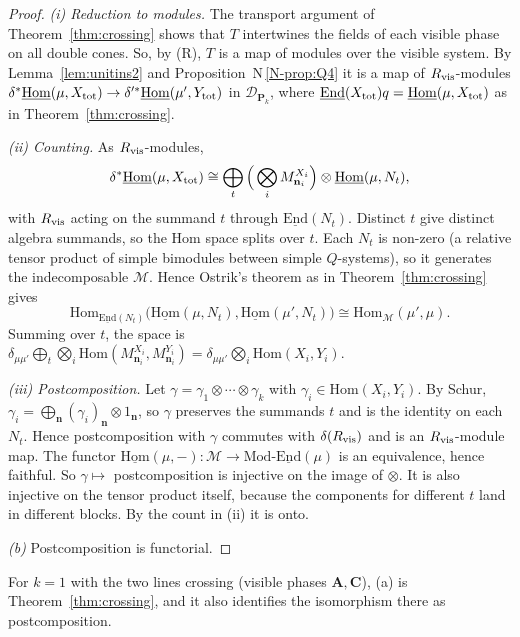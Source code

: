 \documentclass[11pt]{article}
\theoremstyle{definition}
\theoremstyle{remark}
\newcommand{\bfA}{\mathbf A}
\newcommand{\bfC}{\mathbf C}
\newcommand{\nref}[1]{N\,\ref{N-#1}}
\begin{document}
\begin{proof}
\emph{(i) Reduction to modules.} The transport argument of Theorem~\ref{thm:crossing} shows that $T$ intertwines the fields of each visible phase on all double cones. So, by (R), $T$ is a map of modules over the visible system. By Lemma~\ref{lem:unitins2} and Proposition~\nref{prop:Q4} it is a map of $R_{\rm vis}$-modules $\delta^*\underline{\mathrm{Hom}}(\mu,X_{\rm tot})\to\delta'^*\underline{\mathrm{Hom}}(\mu',Y_{\rm tot})$ in $\mathcal D_{\mathbf P_k}$, where $\underline{\mathrm{End}}(X_{\rm tot})q=\underline{\mathrm{Hom}}(\mu,X_{\rm tot})$ as in Theorem~\ref{thm:crossing}.

\emph{(ii) Counting.} As $R_{\rm vis}$-modules,
\[
\delta^*\underline{\mathrm{Hom}}(\mu,X_{\rm tot})\cong\bigoplus_t\Big(\bigotimes_iM^{X_i}_{\mathbf n_i}\Big)\otimes\underline{\mathrm{Hom}}(\mu,N_t),
\]
with $R_{\rm vis}$ acting on the summand $t$ through $\underline{\mathrm{End}}(N_t)$. Distinct $t$ give distinct algebra summands, so the Hom space splits over $t$. Each $N_t$ is non-zero (a relative tensor product of simple bimodules between simple $Q$-systems), so it generates the indecomposable $\mathcal M$. Hence Ostrik's theorem as in Theorem~\ref{thm:crossing} gives
\[
\mathrm{Hom}_{\underline{\mathrm{End}}(N_t)}\big(\underline{\mathrm{Hom}}(\mu,N_t),\underline{\mathrm{Hom}}(\mu',N_t)\big)\cong\mathrm{Hom}_{\mathcal M}(\mu',\mu).
\]
Summing over $t$, the space is $\delta_{\mu\mu'}\bigoplus_t\bigotimes_i\mathrm{Hom}(M^{X_i}_{\mathbf n_i},M^{Y_i}_{\mathbf n_i})=\delta_{\mu\mu'}\bigotimes_i\mathrm{Hom}(X_i,Y_i)$.

\emph{(iii) Postcomposition.} Let $\gamma=\gamma_1\otimes\cdots\otimes\gamma_k$ with $\gamma_i\in\mathrm{Hom}(X_i,Y_i)$. By Schur, $\gamma_i=\bigoplus_{\mathbf n}(\gamma_i)_{\mathbf n}\otimes1_{\mathbf n}$, so $\gamma$ preserves the summands $t$ and is the identity on each $N_t$. Hence postcomposition with $\gamma$ commutes with $\delta(R_{\rm vis})$ and is an $R_{\rm vis}$-module map. The functor $\underline{\mathrm{Hom}}(\mu,-)\colon\mathcal M\to\mathrm{Mod}\text{-}\underline{\mathrm{End}}(\mu)$ is an equivalence, hence faithful. So $\gamma\mapsto$ postcomposition is injective on the image of $\otimes$. It is also injective on the tensor product itself, because the components for different $t$ land in different blocks. By the count in (ii) it is onto.

\emph{(b)} Postcomposition is functorial.
\end{proof}
For $k=1$ with the two lines crossing (visible phases $\bfA,\bfC$), (a) is Theorem~\ref{thm:crossing}, and it also identifies the isomorphism there as postcomposition.
\end{document}
